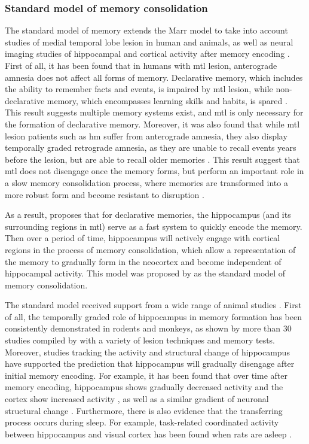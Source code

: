\subsubsection{Standard model of memory consolidation \label{hpc-squire}}
The standard model of memory extends the Marr model to take into account studies of medial temporal lobe lesion in human and animals, as well as neural imaging studies of hippocampal and cortical activity after memory encoding \citep{squire92, squire09}. First of all, it has been found that in humans with \gls{mtl} lesion, anterograde amnesia does not affect all forms of memory. Declarative memory, which includes the ability to remember facts and events, is impaired by \gls{mtl} lesion, while non-declarative memory, which encompasses learning skills and habits, is spared \citep{cohen80, squire04}. This result suggests multiple memory systems exist, and \gls{mtl} is only necessary for the formation of declarative memory. Moreover, it was also found that while \gls{mtl} lesion patients such as \gls{hm} suffer from anterograde amnesia, they also display temporally graded retrograde amnesia, as they are unable to recall events years before the lesion, but are able to recall older memories \citep{marslen-wilson75}. This result suggest that \gls{mtl} does not disengage once the memory forms, but perform an important role in a slow memory consolidation process, where memories are transformed into a more robust form and become resistant to disruption \citep{squire92}. 

As a result, \citet{squire92} proposes that for declarative memories, the hippocampus (and its surrounding regions in \gls{mtl}) serve as a fast system to quickly encode the memory. Then over a period of time, hippocampus will actively engage with cortical regions in the process of memory consolidation, which allow a representation of the memory to gradually form in the neocortex and become independent of hippocampal activity. This model was proposed by \citet{squire92} as the standard model of memory consolidation. 

The standard model received support from a wide range of animal studies \citep{squire09}. First of all, the temporally graded role of hippocampus in memory formation has been consistently demonstrated in rodents and monkeys, as shown by more than 30 studies compiled by \citet{frankland05} with a variety of lesion techniques and memory tests. Moreover, studies tracking the activity and structural change of hippocampus have supported the prediction that hippocampus will gradually disengage after initial memory encoding. For example, it has been found that over time after memory encoding, hippocampus shows gradually decreased activity and the cortex show increased activity \citep[e.g.,][]{bontempi99, frankland04a, takehara-nishiuchi06}, as well as a similar gradient of neuronal structural change \citep[e.g.][]{routtenberg00, maviel04, restivo09}. Furthermore, there is also evidence that the transferring process occurs during sleep. For example, task-related coordinated activity between hippocampus and visual cortex has been found when rats are asleep \citep{ji07}. 


